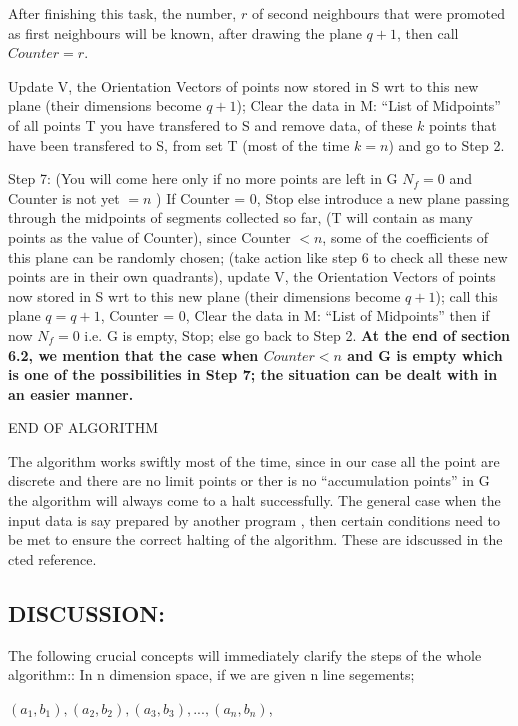 \documentclass[english]{article}
\begin{document}
After finishing this task, the number, $r$ of second neighbours that
were promoted as first neighbours will be known, after drawing the
plane $q+1$, then call $Counter = r$.

Update V, the Orientation Vectors of points now stored in S wrt to
this new plane (their dimensions become $q+1$); Clear the data in
M: {}``List of Midpoints'' of all points T you have transfered to
S and remove data, of these $k$ points that have been transfered
to S, from set T (most of the time $ k=n$) and go to Step 2.

Step 7: (You will come here only if no more points are left in G $N_{f}=0$
and Counter is not yet $=n$ ) If Counter = 0, Stop else introduce
a new plane passing through the midpoints of segments collected so
far, (T will contain as many points as the value of Counter), since
Counter $<n$, some of the coefficients of this plane can be randomly
chosen; (take action like step 6 to check all these new points are
in their own quadrants), update V, the Orientation Vectors of points
now stored in S wrt to this new plane (their dimensions become $q+1$);
call this plane $q=q+1$, Counter = 0, Clear the data in M: {}``List
of Midpoints'' then if now $N_{f}=0$ i.e. G is empty, Stop; else
go back to Step 2. \textbf{At the end of section 6.2, we mention that
the case when $Counter<n$ and G is empty which is one of the possibilities
in Step 7; the situation can be dealt with in an easier manner.}

END OF ALGORITHM

The algorithm works swiftly most of the time, since in our case all
the point are discrete and there are no limit points or ther is no
{}``accumulation points'' in G the algorithm will always come to
a halt successfully. The general case when the input data is say prepared
by another program , then certain conditions need to be met to ensure
the correct halting of the algorithm. These are idscussed in the cted
reference.


\subsection*{DISCUSSION:}

The following crucial concepts will immediately clarify the steps
of the whole algorithm:: In n dimension space, if we are given n line
segements;

$(a_{1},b_{1}),(a_{2},b_{2}),(a_{3},b_{3}),...,(a_{n},b_{n})$,
\end{document}
